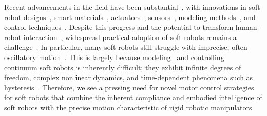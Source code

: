 Recent advancements in the field have been substantial~\cite{yasa2023overview}, with innovations in soft robot designs~\cite{laschi2012soft, hawkes2017soft, guan2023trimmed, katzschmann2018exploration, tolley2014resilient}, smart materials~\cite{terryn2017self, mazzolai2022roadmap}, actuators~\cite{shepherd2013using, vasios2020harnessing, lipton2018handedness, gravert2024low, wehner2016integrated, aubin2022towards}, sensors~\cite{larson2016highly, thuruthel2019soft, truby2020distributed}, modeling methods~\cite{renda2018discrete, boyer2020dynamics, renda2020geometric}, and control techniques~\cite{thuruthel2018model, della2020model, jitosho2023reinforcement, pustina2024input}. Despite this progress and the potential to transform human-robot interaction~\cite{jorgensen2022soft}, widespread practical adoption of soft robots remains a challenge~\cite{hawkes2021hard}. In particular, many soft robots still struggle with imprecise, often oscillatory motion~\cite{mazzolai2022roadmap, majidi2014soft, hawkes2017soft}. This is largely because modeling~\cite{armanini2023soft} and controlling~\cite{della2023model} continuum soft robots is inherently difficult; they exhibit infinite degrees of freedom, complex nonlinear dynamics, and time-dependent phenomena such as hysteresis~\cite{armanini2023soft}.
Therefore, we see a pressing need for novel motor control strategies for soft robots that combine the inherent compliance and embodied intelligence of soft robots with the precise motion characteristic of rigid robotic manipulators.

